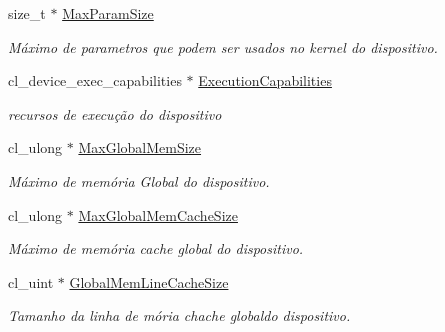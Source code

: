 \begin{DoxyCompactItemize}
\hypertarget{structdevices_ab4f9581fce5ea973d57f55dafb765831}{}\label{structdevices_ab4f9581fce5ea973d57f55dafb765831} 
size\+\_\+t $\ast$ \hyperlink{structdevices_ab4f9581fce5ea973d57f55dafb765831}{Max\+Param\+Size}
\begin{DoxyCompactList}\small\item\em Máximo de parametros que podem ser usados no kernel do dispositivo. \end{DoxyCompactList}\item 
\hypertarget{structdevices_a6822d80f6f4973a4ce8644c186297087}{}\label{structdevices_a6822d80f6f4973a4ce8644c186297087} 
cl\+\_\+device\+\_\+exec\+\_\+capabilities $\ast$ \hyperlink{structdevices_a6822d80f6f4973a4ce8644c186297087}{Execution\+Capabilities}
\begin{DoxyCompactList}\small\item\em recursos de execução do dispositivo \end{DoxyCompactList}\item 
\hypertarget{structdevices_a5ddc90720316ce7161f26263d83d4693}{}\label{structdevices_a5ddc90720316ce7161f26263d83d4693} 
cl\+\_\+ulong $\ast$ \hyperlink{structdevices_a5ddc90720316ce7161f26263d83d4693}{Max\+Global\+Mem\+Size}
\begin{DoxyCompactList}\small\item\em Máximo de memória Global do dispositivo. \end{DoxyCompactList}\item 
\hypertarget{structdevices_a75e0abd182f71d9ccdacaefa759183e1}{}\label{structdevices_a75e0abd182f71d9ccdacaefa759183e1} 
cl\+\_\+ulong $\ast$ \hyperlink{structdevices_a75e0abd182f71d9ccdacaefa759183e1}{Max\+Global\+Mem\+Cache\+Size}
\begin{DoxyCompactList}\small\item\em Máximo de memória cache global do dispositivo. \end{DoxyCompactList}\item 
\hypertarget{structdevices_a6d9b4864fa0e86b5cfac50c34ed49bd3}{}\label{structdevices_a6d9b4864fa0e86b5cfac50c34ed49bd3} 
cl\+\_\+uint $\ast$ \hyperlink{structdevices_a6d9b4864fa0e86b5cfac50c34ed49bd3}{Global\+Mem\+Line\+Cache\+Size}
\begin{DoxyCompactList}\small\item\em Tamanho da linha de mória chache globaldo dispositivo. \end{DoxyCompactList}\item 
\hypertarget{structdevices_a55b41f48a237ce3e06b0d5f68f518ae9}{}\label{structdevices_a55b41f48a237ce3e06b0d5f68f518ae9} 

\end{DoxyCompactItemize}
